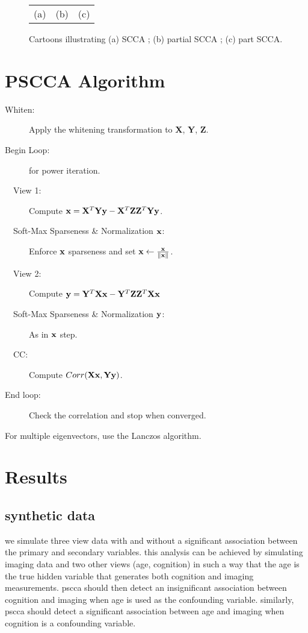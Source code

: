\documentclass{llncs}
\newcommand{\X}{{\bf X}}
\newcommand{\x}{{\bf x}}
\newcommand{\Y}{{\bf Y}}
\newcommand{\y}{{\bf y}}
\newcommand{\Z}{{\bf Z}}
\begin{document}
\begin{figure}
\begin{center}
\begin{tabular}{ccc}
(a) & (b) & (c) \\
\end{tabular}
\end{center}
\caption{\baselineskip 12pt \small Cartoons illustrating (a) SCCA ;
  (b) partial SCCA ; (c) part SCCA.  }
\label{fig:cartoon}
\end{figure}

\section{PSCCA Algorithm}
\vspace{0.1in}
\vspace{-0.1in}
\begin{description}
\item [Whiten:]Apply the whitening transformation to {\X}, {\Y}, {\Z}.
\item [Begin Loop:]for power iteration. 
\item [~~View 1:]Compute  $\x= {\X}^T {\Y} \y -  {\X}^T  {\Z} {\Z}^T {\Y} \y$.
\item [~~Soft-Max Sparseness \& Normalization $\x$:] Enforce $\x$
  sparseness and set $\x \leftarrow \frac{\x}{\|\x\|}$.
\item [~~View 2:]Compute  $\y= {\Y}^T {\X} \x -  {\Y}^T  {\Z} {\Z}^T
  {\X} \x$
\item [~~Soft-Max Sparseness \& Normalization $\y$:] As in $\x$ step.
\item [~~CC:]Compute $Corr( {\X} \x ,  {\Y} \y )$.
\item [End loop:]Check the correlation and stop when converged.
\end{description}
 
For multiple eigenvectors, use the Lanczos algorithm.

\section{Results}
\subsection{synthetic data}
we simulate three view data with and without a significant association
between the primary and secondary variables.  this analysis can be
achieved by simulating imaging data and two other views (age,
cognition) in such a way that the age is the true hidden variable that
generates both cognition and imaging measurements.  pscca should then
detect an insignificant association between cognition and imaging when
age is used as the confounding variable.  similarly, pscca should
detect a significant association between age and imaging when
cognition is a confounding variable.   
\end{document}
